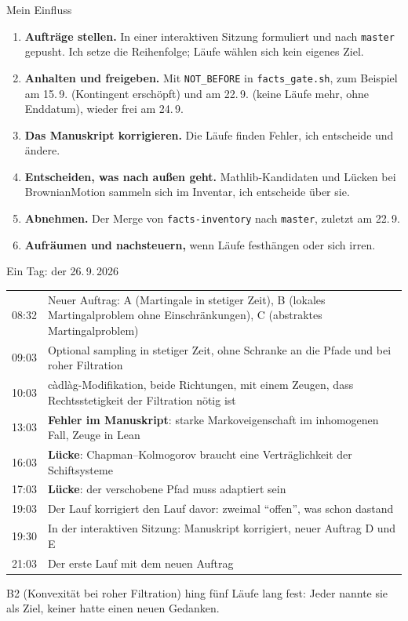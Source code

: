 \documentclass[11pt,aspectratio=169]{beamer}
\newcommand{\datei}[1]{\texttt{#1}}
\begin{document}
\begin{frame}{Mein Einfluss}
  \begin{enumerate}
  \setlength\itemsep{4pt}
  \item \textbf{Aufträge stellen.} In einer interaktiven Sitzung formuliert und
    nach \texttt{master} gepusht. Ich setze die Reihenfolge; Läufe wählen sich
    kein eigenes Ziel.
  \item \textbf{Anhalten und freigeben.} Mit \texttt{NOT\_BEFORE} in
    \datei{facts\_gate.sh}, zum Beispiel am 15.\,9. (Kontingent erschöpft) und am
    22.\,9. (keine Läufe mehr, ohne Enddatum), wieder frei am 24.\,9.
  \item \textbf{Das Manuskript korrigieren.} Die Läufe finden Fehler, ich entscheide
    und ändere.
  \item \textbf{Entscheiden, was nach außen geht.} Mathlib-Kandidaten und Lücken bei
    BrownianMotion sammeln sich im Inventar, ich entscheide über sie.
  \item \textbf{Abnehmen.} Der Merge von \texttt{facts-inventory} nach
    \texttt{master}, zuletzt am 22.\,9.
  \item \textbf{Aufräumen und nachsteuern,} wenn Läufe festhängen oder sich irren.
  \end{enumerate}
\end{frame}

\begin{frame}{Ein Tag: der 26.\,9.\,2026}
  \footnotesize
  \begin{tabular}{@{}lp{}@{}}
    \toprule
    08:32 & Neuer Auftrag: A (Martingale in stetiger Zeit), B (lokales
            Martingalproblem ohne Einschränkungen), C (abstraktes Martingalproblem) \\
    09:03 & Optional sampling in stetiger Zeit, ohne Schranke an die Pfade und bei roher
            Filtration \\
    10:03 & càdlàg-Modifikation, beide Richtungen, mit einem Zeugen, dass Rechtsstetigkeit der
            Filtration nötig ist \\
    13:03 & \textbf{Fehler im Manuskript}: starke Markoveigenschaft im inhomogenen Fall, Zeuge
            in Lean \\
    16:03 & \textbf{Lücke}: Chapman--Kolmogorov braucht eine Verträglichkeit der
            Schiftsysteme \\
    17:03 & \textbf{Lücke}: der verschobene Pfad muss adaptiert sein \\
    19:03 & Der Lauf korrigiert den Lauf davor: zweimal \enquote{offen}, was schon dastand \\
    19:30 & In der interaktiven Sitzung: Manuskript korrigiert, neuer Auftrag D und E \\
    21:03 & Der erste Lauf mit dem neuen Auftrag \\
    \bottomrule
  \end{tabular}

  \medskip
  B2 (Konvexität bei roher Filtration) hing fünf Läufe lang fest: Jeder nannte sie als
  Ziel, keiner hatte einen neuen Gedanken.
\end{frame}
\end{document}
